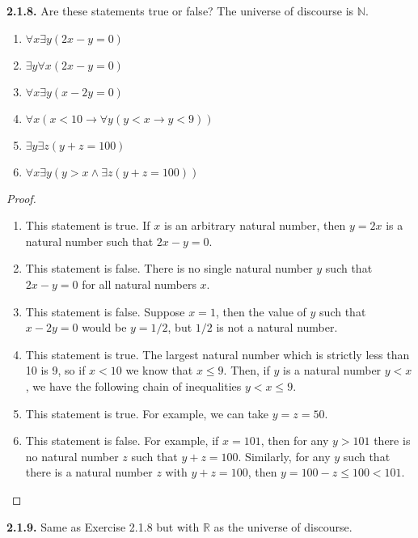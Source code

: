 \documentclass[12pt]{amsart}
\newenvironment{statement}[1]{\smallskip\noindent\color[rgb]{.6627, .3529, .6314} {\bf #1.}}{}
\theoremstyle{definition}
\theoremstyle{remark}
\newcommand{\BR}{\mathbb R}
\newcommand{\BN}{\mathbb N}
\begin{document}
\begin{statement}{2.1.8}
Are these statements true or false?
The universe of discourse is $\BN$.
\begin{enumerate}
	\item $\forall x \exists y (2x - y = 0)$
	\item $\exists y \forall x (2x - y = 0)$
	\item $\forall x \exists y (x - 2y = 0)$
	\item $\forall x (x < 10 \rightarrow \forall y (y < x \rightarrow y < 9))$
	\item $\exists y \exists z (y + z = 100)$
	\item $\forall x \exists y (y > x \wedge \exists z (y + z = 100))$
\end{enumerate}
\end{statement}

\begin{proof}
\hfill
\begin{enumerate}
	\item This statement is true.
	If $x$ is an arbitrary natural number, then $y = 2x$ is a natural number such that $2x - y = 0$.
	
	\item This statement is false.
	There is no single natural number $y$ such that $2x - y = 0$ for all natural numbers $x$.
	
	\item This statement is false.
	Suppose $x = 1$, then the value of $y$ such that $x - 2y = 0$ would be $y = 1/2$, but $1/2$ is not a natural number.
	
	\item This statement is true.
	The largest natural number which is strictly less than 10 is 9, so if $x < 10$ we know that $x \leq 9$.
	Then, if $y$ is a natural number $y < x$, we have the following chain of inequalities $y < x \leq 9$.
	
	\item This statement is true.
	For example, we can take $y = z = 50$.
	
	\item This statement is false.
	For example, if $x = 101$, then for any $y > 101$ there is no natural number $z$ such that $y + z = 100$.
	Similarly, for any $y$ such that there is a natural number $z$ with $y + z = 100$, then $y = 100 - z \leq 100 < 101$.
\end{enumerate}
\end{proof}


\begin{statement}{2.1.9}
Same as Exercise 2.1.8 but with $\BR$ as the universe of discourse.
\end{statement}
\end{document}
